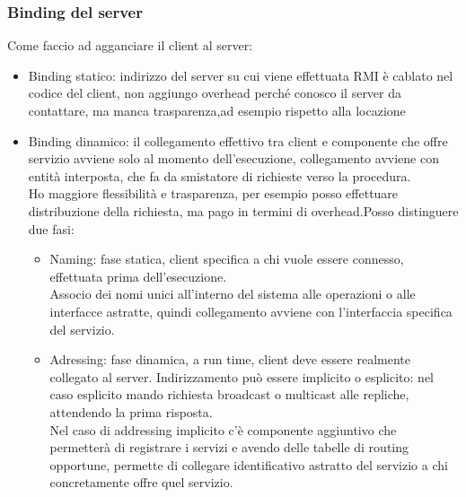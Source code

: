 \documentclass[16px]{article}
\begin{document}
\subsubsection{Binding del server}
Come faccio ad agganciare il client al server:
\begin{itemize}
\item Binding statico: indirizzo del server su cui viene effettuata RMI è cablato nel codice del client, non aggiungo overhead perché conosco il server da contattare, ma manca trasparenza,ad esempio rispetto alla locazione
\item Binding dinamico: il collegamento effettivo tra client e componente che offre servizio avviene solo al momento dell'esecuzione, collegamento avviene con entità interposta, che fa da smistatore di richieste verso la procedura.\\ Ho maggiore flessibilità e trasparenza, per esempio posso effettuare distribuzione della richiesta, ma pago in termini di overhead.Posso distinguere due fasi:
\begin{itemize}
\item Naming: fase statica, client specifica a chi vuole essere connesso, effettuata prima dell'esecuzione.\\ Associo dei nomi unici all'interno del sistema alle operazioni o alle interfacce astratte, quindi collegamento avviene con l'interfaccia specifica del servizio.
\item Adressing: fase dinamica, a run time, client deve essere realmente collegato al server. Indirizzamento può essere implicito o esplicito: nel caso esplicito mando richiesta broadcast o multicast alle repliche, attendendo la prima risposta.\\ Nel caso di addressing implicito c'è componente aggiuntivo che permetterà di registrare i servizi e avendo delle tabelle di routing opportune, permette di collegare identificativo astratto del servizio a chi concretamente offre quel servizio.
\end{itemize}
\end{itemize}
\end{document}
